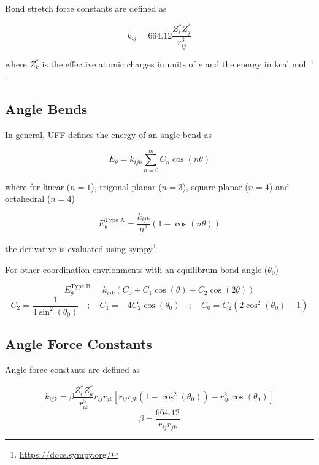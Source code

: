 \documentclass[10pt]{article}
\begin{document}
Bond stretch force constants are defined as

\begin{equation}
    k_{ij} = 664.12 \frac{Z_i^* Z_j^*}{r_{ij}^3}
\end{equation}

where $Z_k^*$ is the effective atomic charges in units of $e$ and the energy in
kcal mol$^{-1}$.

\subsection{Angle Bends}

In general, UFF defines the energy of an angle bend as

\begin{equation}
    E_{\theta} = k_{ijk} \sum_{n=0}^m C_n \cos(n\theta)
\end{equation}

where for linear ($n=1$), trigonal-planar ($n=3$), square-planar ($n=4$) and
octahedral ($n=4$)

\begin{equation}
    E_{\theta}^\text{Type A} = \frac{k_{ijk}}{n^2} (1 - \cos(n\theta))
\end{equation}

the derivative is evaluated using sympy\footnote{\url{https://docs.sympy.org/}}

For other coordination envrionments with an equilibrum bond angle ($\theta_0$)

\begin{equation}
    E_{\theta}^\text{Type B} = k_{ijk}(C_0 + C_1\cos(\theta) + C_2\cos(2\theta))
\end{equation}
\begin{equation}
    C_2 = \frac{1}{4\sin^2(\theta_0)} \quad ;\quad C_1 = -4C_2\cos(\theta_0)
    \quad ; \quad C_0 = C_2(2\cos^2(\theta_0) + 1)
\end{equation}

\subsection{Angle Force Constants}

Angle force constants are defined as

\begin{equation}
    k_{ijk} = \beta \frac{Z_i^* Z_k^*}{r_{ik}^5} r_{ij}r_{jk}
    \left[r_{ij}r_{jk}(1-\cos^2(\theta_0)) - r_{ik}^2\cos(\theta_0) \right]
\end{equation}
\begin{equation}
    \beta = \frac{664.12}{r_{ij} r_{jk}}
\end{equation}
\end{document}
